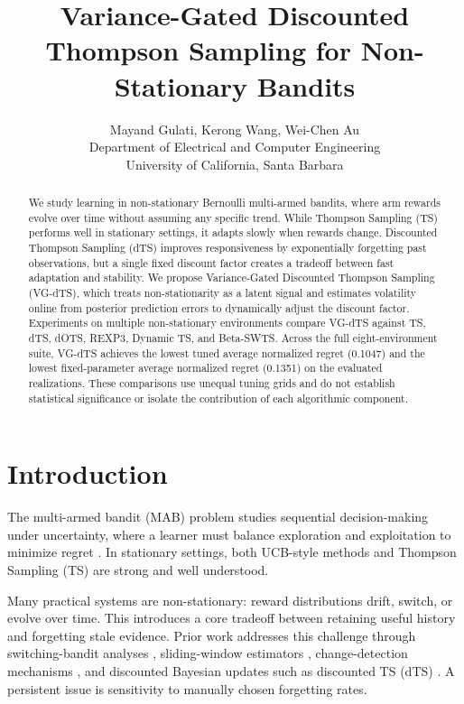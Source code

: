 \documentclass{article}
\title{Variance-Gated Discounted Thompson Sampling for Non-Stationary Bandits}
\author{%
  Mayand Gulati, Kerong Wang, Wei-Chen Au \\
  Department of Electrical and Computer Engineering\\
  University of California, Santa Barbara
}
\begin{document}
\maketitle


\begin{abstract}
 We study learning in non-stationary Bernoulli multi-armed bandits, where arm rewards evolve over time without assuming any specific trend. While Thompson Sampling (TS) performs well in stationary settings, it adapts slowly when rewards change. Discounted Thompson Sampling (dTS) improves responsiveness by exponentially forgetting past observations, but a single fixed discount factor creates a tradeoff between fast adaptation and stability. We propose Variance-Gated Discounted Thompson Sampling (VG-dTS), which treats non-stationarity as a latent signal and estimates volatility online from posterior prediction errors to dynamically adjust the discount factor. Experiments on multiple non-stationary environments compare VG-dTS against TS, dTS, dOTS, REXP3, Dynamic TS, and Beta-SWTS. Across the full eight-environment suite, VG-dTS achieves the lowest tuned average normalized regret (0.1047) and the lowest fixed-parameter average normalized regret (0.1351) on the evaluated realizations. These comparisons use unequal tuning grids and do not establish statistical significance or isolate the contribution of each algorithmic component.
\end{abstract}


\section{Introduction}

The multi-armed bandit (MAB) problem studies sequential decision-making under uncertainty, where a learner must balance exploration and exploitation to minimize regret \cite{robbins1952,lai1985}. In stationary settings, both UCB-style methods \cite{auer2002finite,audibert2009,garivier2011klucb} and Thompson Sampling (TS) \cite{thompson1933,agrawal2012analysis,agrawal2013further,russo2018tutorial} are strong and well understood.

Many practical systems are non-stationary: reward distributions drift, switch, or evolve over time. This introduces a core tradeoff between retaining useful history and forgetting stale evidence. Prior work addresses this challenge through switching-bandit analyses \cite{garivier2011switching,hartland2007,besbes2014}, sliding-window estimators \cite{trovo2020}, change-detection mechanisms \cite{liu2018change}, and discounted Bayesian updates such as discounted TS (dTS) \cite{raj2017taming}. A persistent issue is sensitivity to manually chosen forgetting rates.
\end{document}
